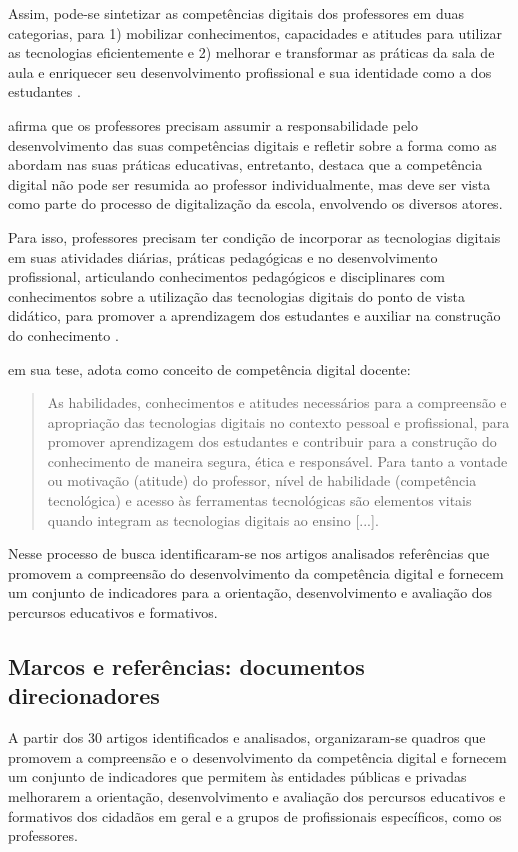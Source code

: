 \documentclass[portuguese]{textolivre}
\begin{document}
Assim, pode-se sintetizar as competências digitais dos professores em
duas categorias, para 1) mobilizar conhecimentos, capacidades e atitudes
para utilizar as tecnologias eficientemente e 2) melhorar e transformar
as práticas da sala de aula e enriquecer seu desenvolvimento
profissional e sua identidade como a dos estudantes
\cite{krumsvik2009}.

\textcite{pettersson2018} afirma que os professores precisam assumir a
responsabilidade pelo desenvolvimento das suas competências digitais e
refletir sobre a forma como as abordam nas suas práticas educativas,
entretanto, destaca que a competência digital não pode ser resumida ao
professor individualmente, mas deve ser vista como parte do processo de
digitalização da escola, envolvendo os diversos atores.

Para isso, professores precisam ter condição de incorporar as
tecnologias digitais em suas atividades diárias, práticas pedagógicas e
no desenvolvimento profissional, articulando conhecimentos pedagógicos e
disciplinares com conhecimentos sobre a utilização das tecnologias
digitais do ponto de vista didático, para promover a aprendizagem dos
estudantes e auxiliar na construção do conhecimento
\cite{instefjord2014, silva2019a}.

\textcite[p.~60]{silva2022} em sua tese, adota como conceito de competência
digital docente:
\begin{quote}
As habilidades, conhecimentos e atitudes necessários para a compreensão
e apropriação das tecnologias digitais no contexto pessoal e
profissional, para promover aprendizagem dos estudantes e contribuir
para a construção do conhecimento de maneira segura, ética e
responsável. Para tanto a vontade ou motivação (atitude) do professor,
nível de habilidade (competência tecnológica) e acesso às ferramentas
tecnológicas são elementos vitais quando integram as tecnologias
digitais ao ensino {[}...{]}.
\end{quote}

Nesse processo de busca identificaram-se nos artigos analisados
referências que promovem a compreensão do desenvolvimento da competência
digital e fornecem um conjunto de indicadores para a orientação,
desenvolvimento e avaliação dos percursos educativos e formativos.



\subsection{Marcos e referências: documentos direcionadores}
A partir dos 30 artigos identificados e analisados, organizaram-se
quadros que promovem a compreensão e o desenvolvimento da competência
digital e fornecem um conjunto de indicadores que permitem às entidades
públicas e privadas melhorarem a orientação, desenvolvimento e avaliação
dos percursos educativos e formativos dos cidadãos em geral e a grupos
de profissionais específicos, como os professores.
\end{document}
